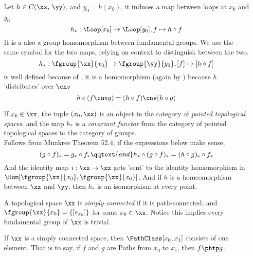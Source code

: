 \documentclass[../main-v2-manifolds.tex]{subfiles}
\begin{document}
\begin{definition}\label{munkres:homomorphism-induced-by-continuous-map}
    Let $h\in C(\xx,\: \yy)$, and $y_0 = h(x_0)$, it induces a map between loops at $x_0$ and $y_0$. 
    \[
        h_*:\Loop[x_0]\to\Loop[y_0], f\mapsto h\circ f
    \]
    It is a also a group homomorphism between fundamental groups. We use the same symbol for the two maps, relying on context to distinguish between the two.
    \[
        h_*:\fgroup{\xx}{x_0}\to\fgroup{\yy}{y_0},[f]\mapsto [h\circ f]
    \]
    is well defined because of , it is a homomorphism (again by ) because $h$ 'distributes' over $\cnv$
    \[
        h\circ (f\cnv g)=(h\circ f)\cnv (h\circ g)
    \]
\end{definition}
\begin{remark}
    If $x_0\in\xx$, the tuple $(x_0, \xx)$ is an object in the category of \emph{pointed topological spaces}, and the map $h_*$ is a \emph{covariant functor} from the category of pointed topological spaces to the category of groups.\\

    Follows from Munkres Theorem 52.4, if the expressions below make sense,
    \[
        (g\circ f)_* = g_*\circ f_*\qqtext{and}  h_*\circ (g\circ f)_* = (h\circ g)_*\circ f_*
    \]
    And the identity map $i:\xx\to\xx$ gets 'sent' to the identity homomorphism in $\Hom[\fgroup{\xx}{x_0},\fgroup{\xx}{x_0}]$. And if $h$ is a homeomorphism between $\xx$ and $\yy$, then $h_*$ is an isomorphism at every point.
\end{remark}


\begin{definition}\label{munkres:simply-connected}
    A topological space $\xx$ is \emph{simply connected} if it is path-connected, and $\fgroup{\xx}{x_0}=\{[e_{x_0}]\}$ for some $x_0\in \xx$. Notice this implies every fundamental group of $\xx$ is trivial.
\end{definition}
\begin{wts}
    If $\xx$ is a simply connected space, then $\PathClass[x_0,x_1]$ consists of one element. That is to say, if $f$ and $g$ are Paths from $x_0$ to $x_1$, then $f\phtp g$.
\end{wts}

\begin{definition}\label{munkres:covering-maps-spaces}
    
\end{definition}
\end{document}
